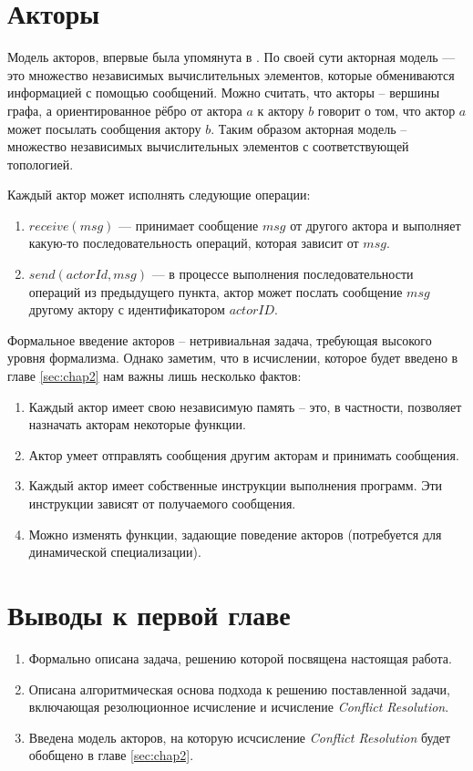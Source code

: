 \section{Акторы}

  Модель акторов, впервые была упомянута в \cite{Hewitt:1973:UMA:1624775.1624804}. По своей сути акторная модель --- это множество независимых вычислительных элементов, которые обмениваются информацией с помощью сообщений. Можно считать, что акторы -- вершины графа, а ориентированное рёбро от актора $a$ к актору $b$ говорит о том, что актор $a$ может посылать сообщения актору $b$. Таким образом акторная модель -- множество независимых вычислительных элементов с соответствующей топологией. 
  
Каждый актор может исполнять следующие операции:

\begin{enumerate}
  	\item $receive(msg)$ --- принимает сообщение $msg$ от другого актора и выполняет какую-то последовательность операций, которая зависит от $msg$.
    \item $send(actorId, msg)$ --- в процессе выполнения последовательности операций из предыдущего пункта, актор может послать сообщение $msg$ другому актору с идентификатором $actorID$.
\end{enumerate}

Формальное введение акторов -- нетривиальная задача, требующая высокого уровня формализма. Однако заметим, что в исчислении, которое будет введено в главе \ref{sec:chap2} нам важны лишь несколько фактов:
\begin{enumerate}
	\item Каждый актор имеет свою независимую память -- это, в частности, позволяет назначать акторам некоторые функции.
    \item Актор умеет отправлять сообщения другим акторам и принимать сообщения.
    \item Каждый актор имеет собственные инструкции выполнения программ. Эти инструкции зависят от получаемого сообщения.
    \item Можно изменять функции, задающие поведение акторов (потребуется для динамической специализации).
\end{enumerate}

\section{Выводы к первой главе}
\begin{enumerate}
	\item Формально описана задача, решению которой посвящена настоящая работа.
    \item Описана алгоритмическая основа подхода к решению поставленной задачи, включающая резолюционное исчисление и исчисление \emph{Conflict Resolution}.
    \item Введена модель акторов, на которую исчсисление \emph{Conflict Resolution} будет обобщено в главе \ref{sec:chap2}.
\end{enumerate}

